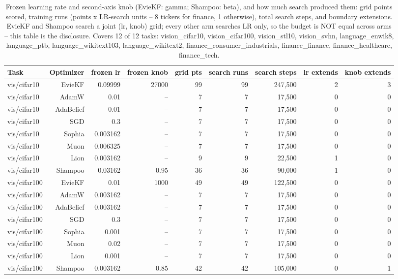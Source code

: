 \begin{table}[t]
\centering
\small
\caption{Frozen learning rate and second-axis knob (EvieKF: gamma; Shampoo: beta), and how much search produced them: grid points scored, training runs (points x LR-search units -- 8 tickers for finance, 1 otherwise), total search steps, and boundary extensions. EvieKF and Shampoo search a joint (lr, knob) grid; every other arm searches LR only, so the budget is NOT equal across arms -- this table is the disclosure. Covers 12 of 12 tasks: vision\_cifar10, vision\_cifar100, vision\_stl10, vision\_svhn, language\_enwik8, language\_ptb, language\_wikitext103, language\_wikitext2, finance\_consumer\_industrials, finance\_finance, finance\_healthcare, finance\_tech.}
\label{tab:table6_tuning_budget}
\begin{tabular}{lrrrrrrrr}
\toprule
Task & Optimizer & frozen lr & frozen knob & grid pts & search runs & search steps & lr extends & knob extends \\
\midrule
vis/cifar10 & EvieKF & 0.09999 & 27000 & 99 & 99 & 247,500 & 2 & 3 \\
vis/cifar10 & AdamW & 0.01 & -- & 7 & 7 & 17,500 & 0 & 0 \\
vis/cifar10 & AdaBelief & 0.01 & -- & 7 & 7 & 17,500 & 0 & 0 \\
vis/cifar10 & SGD & 0.3 & -- & 7 & 7 & 17,500 & 0 & 0 \\
vis/cifar10 & Sophia & 0.003162 & -- & 7 & 7 & 17,500 & 0 & 0 \\
vis/cifar10 & Muon & 0.006325 & -- & 7 & 7 & 17,500 & 0 & 0 \\
vis/cifar10 & Lion & 0.003162 & -- & 9 & 9 & 22,500 & 1 & 0 \\
vis/cifar10 & Shampoo & 0.03162 & 0.95 & 36 & 36 & 90,000 & 1 & 0 \\
vis/cifar100 & EvieKF & 0.01 & 1000 & 49 & 49 & 122,500 & 0 & 0 \\
vis/cifar100 & AdamW & 0.003162 & -- & 7 & 7 & 17,500 & 0 & 0 \\
vis/cifar100 & AdaBelief & 0.003162 & -- & 7 & 7 & 17,500 & 0 & 0 \\
vis/cifar100 & SGD & 0.3 & -- & 7 & 7 & 17,500 & 0 & 0 \\
vis/cifar100 & Sophia & 0.001 & -- & 7 & 7 & 17,500 & 0 & 0 \\
vis/cifar100 & Muon & 0.02 & -- & 7 & 7 & 17,500 & 0 & 0 \\
vis/cifar100 & Lion & 0.001 & -- & 7 & 7 & 17,500 & 0 & 0 \\
vis/cifar100 & Shampoo & 0.003162 & 0.85 & 42 & 42 & 105,000 & 0 & 1 \\

\end{tabular}
\end{table}
